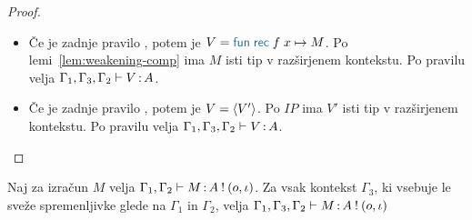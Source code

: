 \begin{proof}
\begin{itemize}
		\item Če je zadnje pravilo , potem je $V = \tmfunrecano{f}{x}{M}$. Po lemi~\ref{lem:weakening-comp} ima $M$ isti tip v razširjenem kontekstu.
		Po pravilu  velja $\Gamma_1, \Gamma_3, \Gamma_2 \vdash V \mathinner{:} A$.
		
		\item Če je zadnje pravilo , potem je $V = \langle V' \rangle$. Po $IP$ ima $V'$ isti tip v razširjenem kontekstu.
		Po pravilu  velja $\Gamma_1, \Gamma_3, \Gamma_2 \vdash V \mathinner{:} A$.
	\end{itemize}
\end{proof}

\begin{lema}\label{lem:weakening-comp}
	Naj za izračun $M$ velja $\Gamma_1, \Gamma_2 \vdash M \mathinner{:} A \mathbin{!} (o, \iota)$. Za vsak kontekst $\Gamma_3$, ki vsebuje le sveže spremenljivke glede na $\Gamma_1$ in $\Gamma_2$, velja $\Gamma_1, \Gamma_3, \Gamma_2 \vdash M \mathinner{:} A \mathbin{!} (o, \iota)$
\end{lema}

